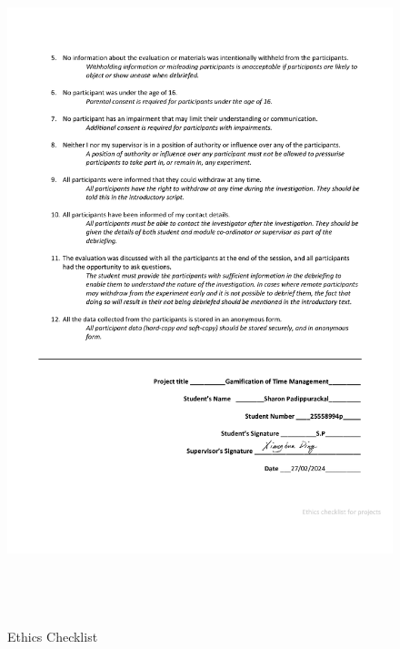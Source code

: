 \documentclass{l4proj}
\begin{document}
\begin{appendices}
\begin{figure}[h]
    \centering
    \includegraphics[height=20cm]{images/34a2091fe24cc99d9a76a9e1640fc37a-1[1].png}
    \caption{Ethics Checklist}

\end{figure}


\end{appendices}
\end{document}

